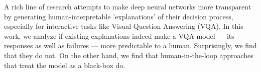 A rich line of research attempts to make deep neural networks more transparent by generating human-interpretable 'explanations' of their decision process, especially for interactive tasks like Visual Question Answering (VQA). In this work, we analyze if existing explanations indeed make a VQA model --- its responses as well as failures --- more predictable to a human. Surprisingly, we find that they do not. On the other hand, we find that human-in-the-loop approaches that treat the model as a black-box do.
